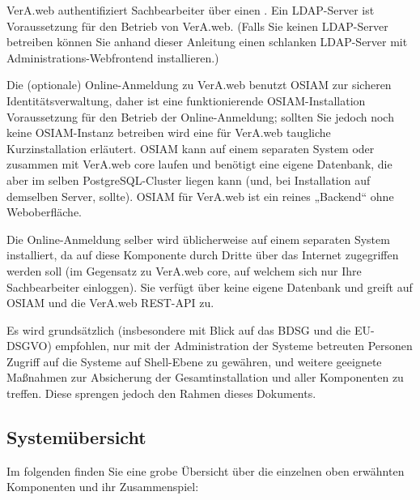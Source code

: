 \documentclass{tarentanleitung}
\begin{document}
VerA.web authentifiziert Sachbearbeiter über einen .
Ein LDAP-Server ist Voraussetzung für den Betrieb von VerA.web.
(Falls Sie keinen LDAP-Server betreiben können Sie anhand dieser Anleitung
einen schlanken LDAP-Server mit Administrations-Webfrontend installieren.)

Die (optionale) Online-Anmeldung zu VerA.web benutzt OSIAM zur sicheren
Identitätsverwaltung, daher ist eine funktionierende OSIAM-Installation
Voraussetzung für den Betrieb der Online-Anmeldung; sollten Sie jedoch
noch keine OSIAM-Instanz betreiben wird eine für VerA.web taugliche
Kurzinstallation erläutert.
OSIAM kann auf einem separaten System oder zusammen mit VerA.web core laufen
und benötigt eine eigene Datenbank, die aber im selben PostgreSQL-Cluster
liegen kann (und, bei Installation auf demselben Server, sollte). OSIAM für
VerA.web ist ein reines „Backend“ ohne Weboberfläche.

Die Online-Anmeldung selber wird üblicherweise auf einem separaten System
installiert, da auf diese Komponente durch Dritte über das Internet
zugegriffen werden soll (im Gegensatz zu VerA.web core, auf welchem
sich nur Ihre Sachbearbeiter einloggen). Sie verfügt über keine eigene
Datenbank und greift auf OSIAM und die VerA.web REST-API zu.

Es wird grundsätzlich (insbesondere mit Blick auf das BDSG und die EU-DSGVO)
empfohlen, nur mit der Administration der Systeme betreuten Personen Zugriff
auf die Systeme auf Shell-Ebene zu gewähren, und weitere geeignete Maßnahmen
zur Absicherung der Gesamtinstallation und aller Komponenten zu treffen.
Diese sprengen jedoch den Rahmen dieses Dokuments.

\subsection{Systemübersicht}\label{subsec:intro-overview-blocks}

Im folgenden finden Sie eine grobe Übersicht über die einzelnen oben
erwähnten Komponenten und ihr Zusammenspiel:\keinumbruch
\end{document}
